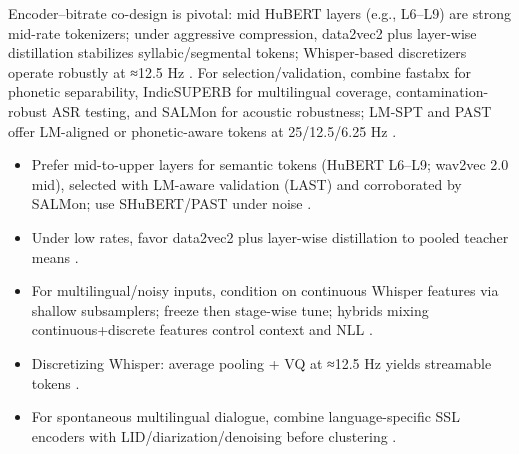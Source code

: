 \documentclass{article}
\begin{document}
Encoder–bitrate co-design is pivotal: mid HuBERT layers (e.g., L6–L9) are strong mid-rate tokenizers; under aggressive compression, data2vec2 plus layer-wise distillation stabilizes syllabic/segmental tokens; Whisper-based discretizers operate robustly at ≈12.5 Hz \cite{wu2024speechcomposerunifyingmultiplespeechtask,baade2024syllablelmlearningcoarsesemanticunitsspe,zeng2024scalingspeechtextpretrainingsyntheticint}. For selection/validation, combine fastabx for phonetic separability, IndicSUPERB for multilingual coverage, contamination-robust ASR testing, and SALMon for acoustic robustness; LM-SPT and PAST offer LM-aligned or phonetic-aware tokens at 25/12.5/6.25 Hz \cite{poli2025fastabxlibraryefficientcomputationabxdis,entry2025indicsuperbspeechprocessinguniversalperf,tseng2025evaluationllmsspeechisoftenflawedtestset,maimon2025salmonsuiteacousticlanguagemodelevaluati,jo2025lmsptalignedsemanticdistillationspeechto,har-tuv2025pastphoneticacousticspeechtokenizer}.

\begin{itemize}
  \item Prefer mid-to-upper layers for semantic tokens (HuBERT L6–L9; wav2vec 2.0 mid), selected with LM-aware validation (LAST) and corroborated by SALMon; use SHuBERT/PAST under noise \cite{turetzky2024lastlanguagemodelawarespeechtokenization,maimon2025salmonsuiteacousticlanguagemodelevaluati,entry2025selectivehubertselfsupervisedpretraining,har-tuv2025pastphoneticacousticspeechtokenizer,chen2023reducingbarriersselfsupervisedlearninghu}.
  \item Under low rates, favor data2vec2 plus layer-wise distillation to pooled teacher means \cite{baade2024syllablelmlearningcoarsesemanticunitsspe}.
  \item For multilingual/noisy inputs, condition on continuous Whisper features via shallow subsamplers; freeze then stage-wise tune; hybrids mixing continuous+discrete features control context and NLL \cite{verma2024whispergpthybridrepresentationaudiolarge,nguyen2025qwenvsgemmaintegrationwhispercomparative,li2025transsionmultilingualspeechrecognitionsy}.
  \item Discretizing Whisper: average pooling + VQ at ≈12.5 Hz yields streamable tokens \cite{zeng2024scalingspeechtextpretrainingsyntheticint}.
  \item For spontaneous multilingual dialogue, combine language-specific SSL encoders with LID/diarization/denoising before clustering \cite{nakata2024jchatjapaneselargescalespokendialoguecor}.
\end{itemize}
\end{document}
